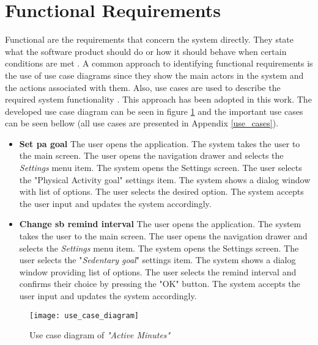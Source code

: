 \section{Functional Requirements}
    Functional are the requirements that concern the system directly. They state what the software product should do or how it should behave when certain conditions are met \citep[84]{sommerville2010}. A common approach to identifying functional requirements is the use of use case diagrams since they show the main actors in the system and the actions associated with them. Also, use cases are used to describe the required system functionality \citep[45-47]{bell2005}. This approach has been adopted in this work. The developed use case diagram can be seen in figure \ref{fig:use-case-diagram} and the important use cases can be seen bellow (all use cases are presented in Appendix \ref{use_cases}).
    
    \begin{itemize}
        \item \textbf{Set \gls{pa} goal}\newline
        The user opens the application. The system takes the user to the main screen. The user opens the navigation drawer and selects the \textit{Settings} menu item. The system opens the Settings screen. The user selects the "Physical Activity goal" settings item. The system shows a dialog window with list of options. The user selects the desired option. The system accepts the user input and updates the system accordingly.
        \item \textbf{Change \gls{sb} remind interval}\newline
        The user opens the application. The system takes the user to the main screen. The user opens the navigation drawer and selects the \textit{Settings} menu item. The system opens the Settings screen. The user selects the "\textit{Sedentary goal}" settings item. The system shows a dialog window providing list of options. The user selects the remind interval and confirms their choice by pressing the "OK" button. The system accepts the user input and updates the system accordingly.
    \end{itemize}
    
    
    \begin{figure}[ht]
        \centering
        \texttt{[image: use\_case\_diagram]}
        \caption{Use case diagram of \textit{"Active Minutes"}}
        \label{fig:use-case-diagram}
    \end{figure}
    
